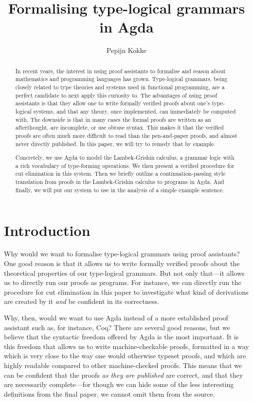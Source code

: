 \documentclass[a4paper]{llncs}
\begin{document}
\title{Formalising type-logical grammars in Agda}%
\author{Pepijn Kokke}%
%
\maketitle

\begin{abstract}
In recent years, the interest in using proof assistants to formalise
and reason about mathematics and programming languages has grown.
Type-logical grammars, being closely related to type theories and
systems used in functional programming, are a perfect candidate to
next apply this curiosity to.
The advantages of using proof assistants is that they allow one to
write formally verified proofs about one's type-logical systems, and
that any theory, once implemented, can immediately be computed with.
The downside is that in many cases the formal proofs are written as an
afterthought, are incomplete, or use obtuse syntax.
This makes it that the verified proofs are often much more difficult
to read than the pen-and-paper proofs, and almost never directly
published.
In this paper, we will try to remedy that by example.

Concretely, we use Agda to model the Lambek-Grishin calculus, a
grammar logic with a rich vocabulary of type-forming operations.
We then present a verified procedure for cut elimination in this
system. Then we briefly outline a continuation-passing style
translation from proofs in the Lambek-Grishin calculus to programs in
Agda. And finally, we will put our system to use in the analysis of a
simple example sentence.
\end{abstract}




\section{Introduction}

Why would we want to formalise type-logical grammars using proof
assistants? One good reason is that it allows us to write formally
verified proofs about the theoretical properties of our type-logical
grammars. But not only that---it allows us to directly run our proofs
as programs. For instance, we can directly run the procedure for cut
elimination in this paper to investigate what kind of derivations are
created by it \textit{and} be confident in its correctness.

Why, then, would we want to use Agda instead of a more established
proof assistant such as, for instance, Coq? There are several good
reasons, but we believe that the syntactic freedom offered by Agda is
the most important.
It is this freedom that allows us to write machine-checkable proofs,
formatted in a way which is very close to the way one would otherwise
typeset proofs, and which are highly readable compared to other
machine-checked proofs.
This means that we can be confident that the proofs \textit{as they
are published} are correct, and that they are necessarily complete---for
though we can hide some of the less interesting definitions from the
final paper, we cannot omit them from the source.
\end{document}
